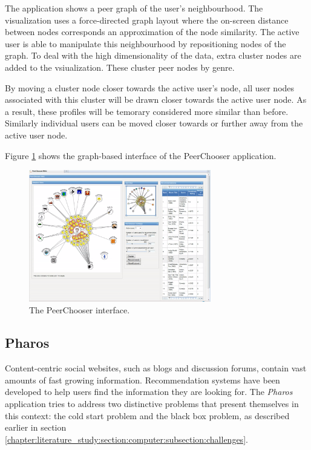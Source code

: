 The application shows a peer graph of the user's neighbourhood. The visualization uses a force-directed graph layout where the on-screen distance between nodes corresponds an approximation of the node similarity. The active user is able to manipulate this neighbourhood by repositioning nodes of the graph. To deal with the high dimensionality of the data, extra cluster nodes are added to the vsiualization. These cluster peer nodes by genre\cite{odonovan:2008}.

By moving a cluster node closer towards the active user's node, all user nodes associated with this cluster will be drawn closer towards the active user node. As a result, these profiles will be temorary considered more similar than before. Similarly individual users can be moved closer towards or further away from the active user node\cite{odonovan:2008}.

Figure \ref{figure:peerchooser} shows the graph-based interface of the PeerChooser application.

\begin{figure}%
	\begin{center}
		\includegraphics[width=300px]{img/peerchooser}%
	\end{center}
	\caption{The PeerChooser interface.}%
	\label{figure:peerchooser}%
\end{figure}



\subsection{Pharos}\label{chapter:survey:section:applications:subsection:pharos}

Content-centric social websites, such as blogs and discussion forums, contain vast amounts of fast growing information. Recommendation systems have been developed to help users find the information they are looking for. The \emph{Pharos} application tries to address two distinctive problems that present themselves in this context: the cold start problem and the black box problem\cite{zhao:2010}, as described earlier in section \ref{chapter:literature_study:section:computer:subsection:challenges}.

